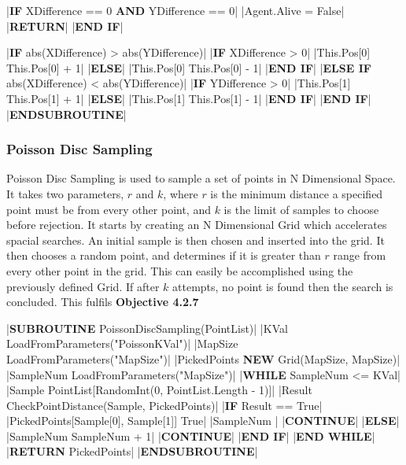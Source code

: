 \begin{flushleft}
\begin{pseudocode}
    |\textbf{IF} XDifference == 0 \textbf{AND} YDifference == 0|
        |Agent.Alive = False|
        |\textbf{RETURN}|
    |\textbf{END IF}|

    |\textbf{IF} abs(XDifference) > abs(YDifference)|
        |\textbf{IF} XDifference > 0|
            |This.Pos[0] \leftarrow This.Pos[0] + 1|
        |\textbf{ELSE}|
            |This.Pos[0] \leftarrow This.Pos[0] - 1|
        |\textbf{END IF}|
    |\textbf{ELSE IF} abs(XDifference) < abs(YDifference)|
        |\textbf{IF} YDifference > 0|
            |This.Pos[1] \leftarrow This.Pos[1] + 1|
        |\textbf{ELSE}|
            |This.Pos[1] \leftarrow This.Pos[1] - 1|
        |\textbf{END IF}|
    |\textbf{END IF}|
|\textbf{ENDSUBROUTINE}|
                \end{pseudocode}
                
                \vspace{0.5cm}
            \subsubsection{Poisson Disc Sampling}
                Poisson Disc Sampling is used to sample a set of points in N Dimensional Space. It takes two parameters, $r$ and $k$, where
                $r$ is the minimum distance a specified point must be from every other point, and $k$ is the limit of samples to choose
                before rejection. It starts by creating an N Dimensional Grid which accelerates spacial searches. An initial sample is then
                chosen and inserted into the grid. It then chooses a random point, and determines if it is greater than $r$ range from every 
                other point in the grid. This can easily be accomplished using the previously defined Grid. If after $k$ attempts, no point is
                found then the search is concluded. This fulfils \textbf{Objective 4.2.7}

                \vspace{0.2cm}
                \begin{pseudocode}
|\textbf{SUBROUTINE} PoissonDiscSampling(PointList)|
    |KVal \leftarrow LoadFromParameters("PoissonKVal")|
    |MapSize \leftarrow LoadFromParameters("MapSize")|
    |PickedPoints \leftarrow \textbf{NEW} Grid(MapSize, MapSize)|
    |SampleNum \leftarrow LoadFromParameters("MapSize")|
    |\textbf{WHILE} SampleNum <= KVal|
        |Sample \leftarrow PointList[RandomInt(0, PointList.Length - 1)]|
        |Result \leftarrow CheckPointDistance(Sample, PickedPoints)|
        |\textbf{IF} Result == True|
            |PickedPoints[Sample[0], Sample[1]] \leftarrow True|
            |SampleNum |
            |\textbf{CONTINUE}|
        |\textbf{ELSE}|
            |SampleNum \leftarrow SampleNum + 1|
            |\textbf{CONTINUE}|
        |\textbf{END IF}|
    |\textbf{END WHILE}|
    |\textbf{RETURN} PickedPoints|
|\textbf{ENDSUBROUTINE}|
                \end{pseudocode}
                

\end{flushleft}

